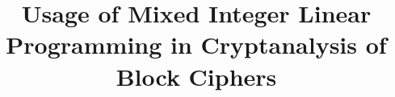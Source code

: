 \documentclass[runningheads]{llncs}
\begin{document}
%
\title{Usage of Mixed Integer Linear Programming in Cryptanalysis of Block Ciphers}
%
%
%
%
%
\maketitle              %
%














\end{document}
